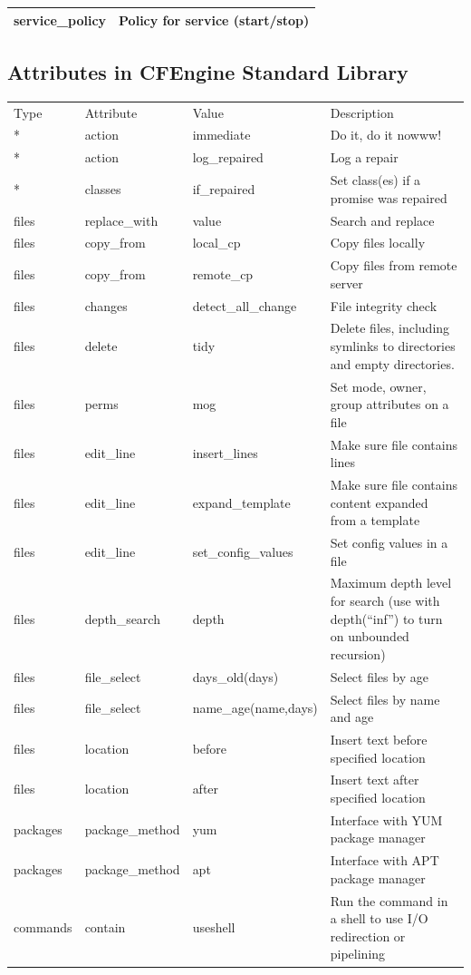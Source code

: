 \begin{longtable}{|l|l|}
\hline
service\_policy & Policy for service (start/stop)\\
\hline
\end{longtable}

\subsection{Attributes in CFEngine Standard Library}

\begin{longtable}{|l|l|l|l|}
\hline
Type & Attribute & Value & Description\\
* & action & immediate & Do it, do it nowww!\\
* & action & log\_repaired & Log a repair\\
* & classes & if\_repaired & Set class(es) if a promise was repaired\\
files & replace\_with & value & Search and replace\\
files & copy\_from & local\_cp & Copy files locally\\
files & copy\_from & remote\_cp & Copy files from remote server\\
files & changes & detect\_all\_change & File integrity check\\
files & delete & tidy & Delete files, including symlinks to directories and empty directories.\\
files & perms & mog & Set mode, owner, group attributes on a file\\
files & edit\_line & insert\_lines & Make sure file contains lines\\
files & edit\_line & expand\_template & Make sure file contains content expanded from a template\\
files & edit\_line & set\_config\_values & Set config values in a file\\
files & depth\_search & depth & Maximum depth level for search (use with depth(``inf'') to turn on unbounded recursion)\\
files & file\_select & days\_old(days) & Select files by age\\
files & file\_select & name\_age(name,days) & Select files by name and age\\
files & location & before & Insert text before specified location\\
files & location & after & Insert text after specified location\\
packages & package\_method & yum & Interface with YUM package manager\\
packages & package\_method & apt & Interface with APT package manager\\
commands & contain & useshell & Run the command in a shell to use I/O redirection or pipelining\\
\hline
\end{longtable}


